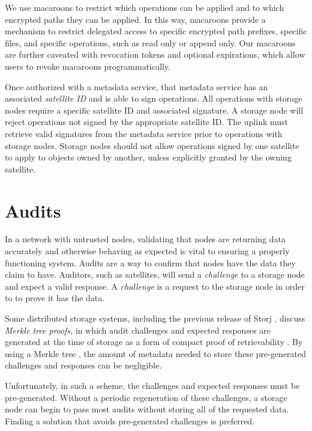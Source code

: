 \documentclass[11pt,fleqn,openany]{book}
\begin{document}
We use macaroons to restrict which operations can be applied and to which
encrypted paths they can be applied. In this way, macaroons provide a
mechanism to restrict delegated access to specific encrypted path prefixes,
specific files, and specific operations, such as read only or append only.
Our macaroons are further caveated with revocation tokens and optional
expirations, which allow users to revoke macaroons programmatically.

Once authorized with a metadata service, that metadata service has an associated
{\em satellite ID} and is able to sign operations. All
operations with storage nodes require a specific satellite ID and associated
signature. A storage node will reject operations not signed by the appropriate
satellite ID. The uplink must retrieve valid signatures from the metadata
service prior to operations with storage nodes. Storage nodes should not allow
operations signed by one satellite to apply to objects owned by another, unless
explicitly granted by the owning satellite.

\section{Audits}\label{sec:concrete-audits}

In a network with untrusted nodes, validating that nodes are returning data
accurately and otherwise behaving as expected is vital to ensuring a properly
functioning system. Audits are a way to confirm that nodes have the data they
claim to have. Auditors, such as satellites, will send a {\em challenge} to a
storage node and expect a valid response. A {\em challenge} is a request to the
storage node in order to to prove it has the data.

Some distributed storage systems, including the previous release of Storj
\cite{storj-v2}, discuss {\em Merkle tree proofs}, in which audit challenges
and expected responses are generated at the time of storage as a form of compact
proof of retrievability \cite{proof-of-retrievability}. By using a Merkle tree
\cite{merkle-tree}, the amount of metadata needed to store these pre-generated
challenges and responses can be negligible.

Unfortunately, in such a scheme, the challenges and expected responses must be
pre-generated. Without a periodic regeneration of these challenges, a
storage node can begin to pass most audits without storing all of the requested
data. Finding a solution that avoids pre-generated challenges is preferred.
\end{document}
